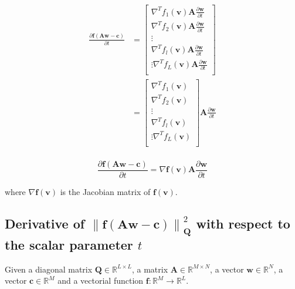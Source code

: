 \begin{align}
\frac{\partial \mathbf{f}\left(\mathbf{A}\mathbf{w}-\mathbf{c}\right)}{\partial t}
&=
\begin{bmatrix}
\nabla^{T} f_{1}\left(\mathbf{v}\right)
\mathbf{A}\frac{\partial \mathbf{w}}{\partial t}\\[4pt]
\nabla^{T} f_{2}\left(\mathbf{v}\right)
\mathbf{A}\frac{\partial \mathbf{w}}{\partial t}\\[4pt]
\vdots\\[4pt]
\nabla^{T} f_{l}\left(\mathbf{v}\right)
\mathbf{A}\frac{\partial \mathbf{w}}{\partial t}\\[4pt]
\vdots
\nabla^{T} f_{L}\left(\mathbf{v}\right)
\mathbf{A}\frac{\partial \mathbf{w}}{\partial t}\\[4pt]
\end{bmatrix}\\
&=
\begin{bmatrix}
\nabla^{T} f_{1}\left(\mathbf{v}\right)\\[4pt]
\nabla^{T} f_{2}\left(\mathbf{v}\right)\\[4pt]
\vdots\\[4pt]
\nabla^{T} f_{l}\left(\mathbf{v}\right)\\[4pt]
\vdots
\nabla^{T} f_{L}\left(\mathbf{v}\right)\\[4pt]
\end{bmatrix}
\mathbf{A}\frac{\partial \mathbf{w}}{\partial t}\\
\end{align}

\begin{equation}
\label{eq:DfAwc}
\frac{\partial \mathbf{f}\left(\mathbf{A}\mathbf{w}-\mathbf{c}\right)}{\partial t}
=
\nabla \mathbf{f}(\mathbf{v})
\mathbf{A}\frac{\partial \mathbf{w}}{\partial t}
\end{equation}

where $\nabla \mathbf{f}(\mathbf{v})$ is the Jacobian matrix of $\mathbf{f}(\mathbf{v})$. 

\subsection{Derivative of $\left\|\mathbf{f}\left(\mathbf{A}\mathbf{w}-\mathbf{c}\right)\right\|_{\mathbf{Q}}^2$ with respect to the scalar parameter $t$}

Given a diagonal matrix $\mathbf{Q} \in \mathbb{R}^{L\times L}$,
a matrix $\mathbf{A} \in \mathbb{R}^{M\times N}$,
a vector $\mathbf{w} \in \mathbb{R}^{N}$,
a vector $\mathbf{c} \in \mathbb{R}^{M}$ and 
a vectorial function $\mathbf{f}:\mathbb{R}^{M} \to \mathbb{R}^{L}$.

